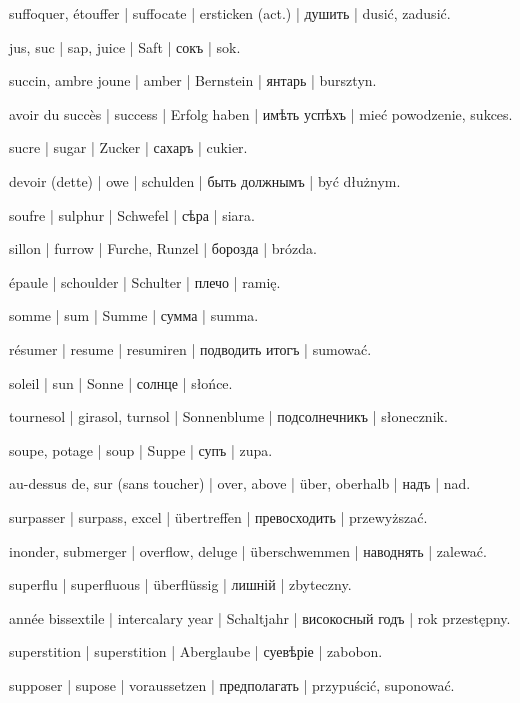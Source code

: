 \begin{outdent}{1em}
suffoquer, étouffer | suffocate | ersticken (act.) | душить | dusić, zadusić.

jus, suc | sap, juice | Saft | сокъ | sok.

succin, ambre joune | amber | Bernstein | янтарь | bursztyn.

avoir du succès | success | Erfolg haben | имѣть успѣхъ | mieć powodzenie, sukces.

sucre | sugar | Zucker | сахаръ | cukier.

devoir (dette) | owe | schulden | быть должнымъ | być dłużnym.

soufre | sulphur | Schwefel | сѣра | siara.

sillon | furrow | Furche, Runzel | борозда | brózda.

épaule | schoulder | Schulter | плечо | ramię.

somme | sum | Summe | сумма | summa.

\uvsubentry{}
résumer | resume | resumiren | подводить итогъ | sumować.

soleil | sun | Sonne | солнце | słońce.

\uvsubentry{}
tournesol | girasol, turnsol | Sonnenblume | подсолнечникъ | słonecznik.

soupe, potage | soup | Suppe | супъ | zupa.

au-dessus de, sur (sans toucher) | over, above | über,
oberhalb | надъ | nad.

\uvsubentry{}
surpasser | surpass, excel | übertreffen | превосходить | przewyższać.


\uvsubentry{}
inonder, submerger | overflow, deluge | überschwemmen | наводнять | zalewać.


\uvsubentry{}
superflu | superfluous | überflüssig | лишній | zbyteczny.


\uvsubentry{}
année bissextile | intercalary year | Schaltjahr | високосный годъ | rok przestępny.

superstition | superstition | Aberglaube | суевѣріе | zabobon.

supposer | supose | voraussetzen | предполагать | przypuścić,
suponować.


\end{outdent}
